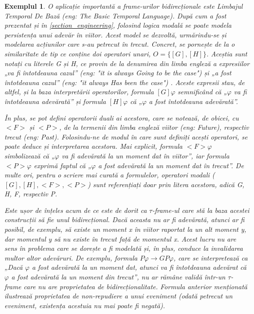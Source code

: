 \documentclass[12pt, openany]{book}
\newtheorem{example}[definition]{Exemplul} %
\newcommand{\mysectionreference}[1]{\autoref{#1}}
\newcommand{\myenglishterm}[1]{(\textit{eng: #1})}
\begin{document}
            \begin{example}
                O aplicație importantă a \textit{frame}-urilor bidirecționale este Limbajul Temporal De Bază 
                \myenglishterm{The Basic Temporal Language}. După cum a fost prezentat și în 
                \mysectionreference{section_engineering}, folosind logica modală se poate modela persistența unui adevăr
                în viitor. Acest model se dezvoltă, urmărindu-se și modelarea acțiunilor care s-au petrecut în trecut. 
                Concret, se pornește de la o similaritate de tip ce conține doi operatori unari, $O=\{[G], [H]\}$. 
                Aceștia sunt notați cu literele G și H, ce provin de la denumirea din limba engleză a expresiilor „va fi
                întotdeauna cazul” \myenglishterm{"it is always Going to be the case"} și „a fost întotdeauna cazul” 
                \myenglishterm{"it always Has been the case"} \cite{modal_logic}. Aceste expresii stau, de altfel, și la
                baza interpretării operatorilor, formula $[G]\varphi$ semnificând că „$\varphi$ va fi întotdeauna 
                adevărată” și formula $[H]\varphi$ că „$\varphi$ a fost întotdeauna adevărată”.

                În plus, se pot defini operatorii duali ai acestora, care se notează, de obicei, cu $<F>$ și $<P>$, de 
                la termenii din limba engleză viitor \myenglishterm{Future}, respectiv trecut \myenglishterm{Past}. 
                Folosindu-ne de modul în care sunt definiți acești operatori, se poate deduce și interpretarea acestora.
                Mai explicit, formula $<F> \varphi$ simbolizează că „$\varphi$ va fi adevărată la un moment dat în 
                viitor”, iar formula $<P> \varphi$ exprimă faptul că „$\varphi$ a fost adevărată la un moment dat în 
                trecut”. De multe ori, pentru o scriere mai curată a formulelor, operatori modali ($[G], [H], <F>, <P>$)
                sunt referențiați doar prin litera acestora, adică G, H, F, respectiv P.

                Este ușor de înțeles acum de ce este de dorit ca $\tau$-\textit{frame}-ul care stă la baza acestei 
                construcții să fie unul bidirecțional. Dacă aceasta nu ar fi adevărată, atunci ar fi posibil, de 
                exemplu, să existe un moment x în viitor raportat la un alt moment y, dar momentul y să nu existe în 
                trecut față de momentul x. Acest lucru nu are sens în problema care se dorește a fi modelată și, în 
                plus, conduce la invalidarea multor altor adevăruri. De exemplu, formula $P \varphi \rightarrow G P 
                \varphi$, care se interpretează ca „Dacă $\varphi$ a fost adevărată la un moment dat, atunci va fi 
                întotdeauna adevărat că $\varphi$ a fost adevărată la un moment din trecut”, nu ar rămâne validă într-un 
                $\tau$-\textit{frame} care nu are proprietatea de bidirecționalitate. Formula anterior menționată 
                ilustrează proprietatea de non-repudiere a unui eveniment (odată petrecut un eveniment, existența 
                acestuia nu mai poate fi negată).


\end{example}
\end{document}
